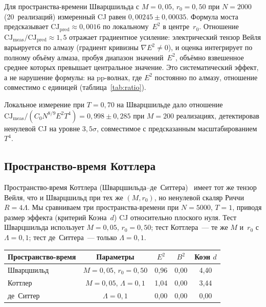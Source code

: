 \documentclass[12pt,a4paper]{article}
\theoremstyle{plain}
\theoremstyle{definition}
\theoremstyle{remark}
\newcommand{\CJ}{\mathrm{CJ}}
\begin{document}
Для пространства-времени Шварцшильда с $M = 0{,}05$,
$r_0 = 0{,}50$ при $N = 2000$ (20~реализаций) измеренный
CJ равен $0{,}00245 \pm 0{,}00035$.  Формула моста
предсказывает
$\CJ_{\mathrm{pred}} \approx 0{,}0016$ по локальному~$E^2$
в центре~$r_0$.  Отношение
$\CJ_{\mathrm{meas}} / \CJ_{\mathrm{pred}} \approx 1{,}5$
отражает градиентное усиление: электрический тензор Вейля
варьируется по алмазу (градиент кривизны
$\nabla E^2 \neq 0$), и оценка интегрирует по полному
объёму алмаза, пробуя диапазон значений~$E^2$, объёмно
взвешенное среднее которых превышает центральное значение.
Это систематический эффект, а не нарушение формулы: на
pp-волнах, где $E^2$ постоянно по алмазу, отношение
совместимо с единицей (таблица~\ref{tab:ratio}).

Локальное измерение при $T = 0{,}70$ на Шварцшильде дало
отношение $\CJ_{\mathrm{meas}} / (C_0 N^{8/9} E^2 T^4) =
0{,}998 \pm 0{,}285$ при $M = 200$ реализациях, детектировав
ненулевой CJ на уровне $3{,}5\sigma$, совместимое с
предсказанным масштабированием~$T^4$.

\subsection{Пространство-время Коттлера}
\label{sec:kottler}

Пространство-время
Коттлера (Шварцшильда--де~Ситтера)~\cite{Kottler:1918}
имеет тот же тензор Вейля, что и Шварцшильд при тех же
$(M, r_0)$, но ненулевой скаляр Риччи $R = 4\Lambda$.  Мы
сравниваем три пространства-времени при $N = 5000$, $T = 1$,
приводя размер эффекта (критерий Коэна~$d$) CJ относительно
плоского нуля.  Тест Шварцшильда использует $M = 0{,}05$,
$r_0 = 0{,}50$; тест Коттлера~--- те же $M$ и~$r_0$ с
$\Lambda = 0{,}1$; тест де~Ситтера~--- только
$\Lambda = 0{,}1$.

\begin{center}
\begin{tabular}{lcccc}
\toprule
Пространство-время & Параметры & $E^2$ & $B^2$ & Коэн $d$ \\
\midrule
Шварцшильд  & $M = 0{,}05$, $r_0 = 0{,}50$ & 0,96 & 0,00 & 4,40 \\
Коттлер     & $M = 0{,}05$, $\Lambda = 0{,}1$ & 1,04 & 0,00 & 3,44 \\
де~Ситтер   & $\Lambda = 0{,}1$ & 0,00 & 0,00 & 0,00 \\
\bottomrule
\end{tabular}
\end{center}
\end{document}
